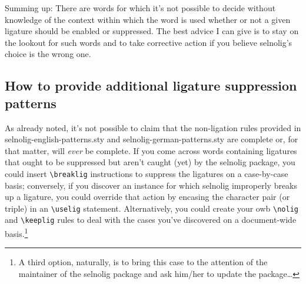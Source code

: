 \documentclass[11pt]{article}
\newcommand{\pkg}[1]{\textsf{#1}}
\newcommand{\cmmd}[1]{\texttt{\textbackslash #1}}
\begin{document}
Summing up: There are words for which it's not possible to decide without knowledge of the context within which the word is used whether or not a given ligature should be enabled or suppressed. The best advice I can give is to stay on the lookout for such words and to take corrective action if you believe \pkg{selnolig}'s choice is the wrong one.



\subsection{How to provide additional ligature suppression patterns}

As already noted, it's not possible to claim that the non-ligation rules provided in \pkg{selnolig-english-patterns.sty} and \pkg{selnolig-german-patterns.sty} are complete or, for that matter, will \emph{ever} be complete. If you come across words containing ligatures that ought to be suppressed but aren't caught (yet) by the \pkg{selnolig} package, you could insert \cmmd{breaklig} instructions to suppress the ligatures on a case-by-case basis; conversely, if you discover an instance for which \pkg{selnolig} improperly breaks up a ligature, you could override that action by encasing the character pair (or triple) in an \cmmd{uselig} statement. Alternatively, you could create your owb \cmmd{nolig} and \cmmd{keeplig} rules to deal with the cases you've discovered on a document-wide basis.\footnote{A third option, naturally, is to bring this case to the attention of the maintainer of the \pkg{selnolig} package and ask him/her to update the package\dots}
\end{document}
